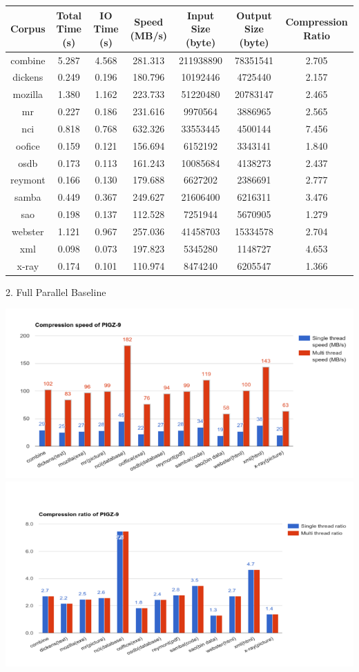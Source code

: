 \begin{center}
\begin{tabular}{ |c|c|c|c|c|c|c| } 
 \hline
Corpus & Total Time (s) & IO Time (s) & Speed (MB/s) & Input Size (byte) & Output Size (byte) & Compression Ratio\\
\hline
combine & 5.287 & 4.568 & 281.313 & 211938890 & 78351541 & 2.705\\
\hline
dickens & 0.249 & 0.196 & 180.796 & 10192446 & 4725440 & 2.157\\
\hline
mozilla & 1.380 & 1.162 & 223.733 & 51220480 & 20783147 & 2.465\\
\hline
mr & 0.227 & 0.186 & 231.616 & 9970564 & 3886965 & 2.565\\
\hline
nci & 0.818 & 0.768 & 632.326 & 33553445 & 4500144 & 7.456\\
\hline
oofice & 0.159 & 0.121 & 156.694 & 6152192 & 3343141 & 1.840\\
\hline
osdb & 0.173 & 0.113 & 161.243 & 10085684 & 4138273 & 2.437\\
\hline
reymont & 0.166 & 0.130 & 179.688 & 6627202 & 2386691 & 2.777\\
\hline
samba & 0.449 & 0.367 & 249.627 & 21606400 & 6216311 & 3.476\\
\hline
sao & 0.198 & 0.137 & 112.528 & 7251944 & 5670905 & 1.279\\
\hline
webster & 1.121 & 0.967 & 257.036 & 41458703 & 15334578 & 2.704\\
\hline
xml & 0.098 & 0.073 & 197.823 & 5345280 & 1148727 & 4.653\\
\hline
x-ray & 0.174 & 0.101 & 110.974 & 8474240 & 6205547 & 1.366\\
\hline
\end{tabular}
2. Full Parallel Baseline
\end{center}

\includegraphics[width=1\textwidth]{screen1}
\includegraphics[width=1\textwidth]{screen2}

